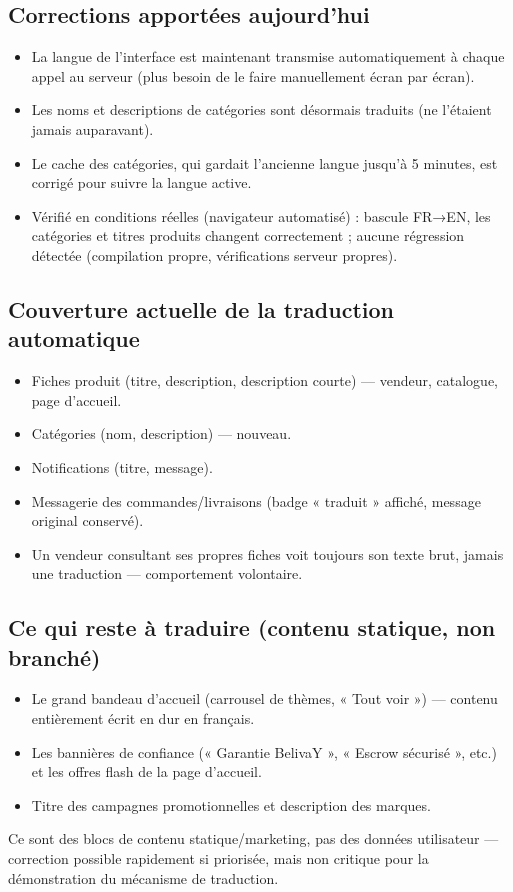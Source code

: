 \documentclass[11pt]{article}
\newcommand{\fait}[1]{\item[\textcolor{okgreen}{\textbf{\checkmark}}] #1}
\newcommand{\reste}[1]{\item[\textcolor{warnred}{\textbf{!}}] #1}
\newcommand{\info}[1]{\item[\textcolor{graytext}{\textbf{i}}] #1}
\begin{document}
\subsection*{Corrections apportées aujourd'hui}
\begin{itemize}
\fait{La langue de l'interface est maintenant transmise automatiquement à chaque appel au serveur (plus besoin de le faire manuellement écran par écran).}
\fait{Les noms et descriptions de catégories sont désormais traduits (ne l'étaient jamais auparavant).}
\fait{Le cache des catégories, qui gardait l'ancienne langue jusqu'à 5 minutes, est corrigé pour suivre la langue active.}
\fait{Vérifié en conditions réelles (navigateur automatisé) : bascule FR→EN, les catégories et titres produits changent correctement ; aucune régression détectée (compilation propre, vérifications serveur propres).}
\end{itemize}

\subsection*{Couverture actuelle de la traduction automatique}
\begin{itemize}
\fait{Fiches produit (titre, description, description courte) — vendeur, catalogue, page d'accueil.}
\fait{Catégories (nom, description) — nouveau.}
\fait{Notifications (titre, message).}
\fait{Messagerie des commandes/livraisons (badge « traduit » affiché, message original conservé).}
\info{Un vendeur consultant ses propres fiches voit toujours son texte brut, jamais une traduction — comportement volontaire.}
\end{itemize}

\subsection*{Ce qui reste à traduire (contenu statique, non branché)}
\begin{itemize}
\reste{Le grand bandeau d'accueil (carrousel de thèmes, « Tout voir ») — contenu entièrement écrit en dur en français.}
\reste{Les bannières de confiance (« Garantie BelivaY », « Escrow sécurisé », etc.) et les offres flash de la page d'accueil.}
\reste{Titre des campagnes promotionnelles et description des marques.}
\end{itemize}
Ce sont des blocs de contenu statique/marketing, pas des données utilisateur — correction possible rapidement si priorisée, mais non critique pour la démonstration du mécanisme de traduction.
\end{document}
